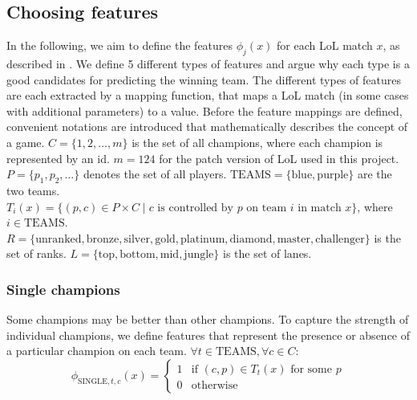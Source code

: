 \subsection{Choosing features}\label{sec:choosingfeatures}
In the following, we aim to define the features $\phi_j(x)$ for each LoL match $x$, as described in .
We define 5 different types of features and argue why each type is a good candidates for predicting the winning team.
The different types of features are each extracted by a mapping function, that maps a LoL match (in some cases with additional parameters) to a value. 
Before the feature mappings are defined, convenient notations are introduced that mathematically describes the concept of a game.
$C = \{1, 2, \dots, m\}$ is the set of all champions, where each champion is represented by an id. $m = 124$ for the patch version of LoL used in this project.
$P = \{p_1, p_2, \dots\}$ denotes the set of all players.
$\text{TEAMS} = \{\text{blue}, \text{purple}\}$ are the two teams.
$T_i(x) = \{ (p, c) \in P \times C \mid c \text{ is controlled by } p \text{ on team } i  \text{ in match } x \}$, where $i \in \text{TEAMS}$.\\
$R = \{\text{unranked},\text{bronze},\text{silver},\text{gold},\text{platinum},\text{diamond},\text{master},\text{challenger}\}$ is the set of ranks.
$L = \{\text{top},\text{bottom},\text{mid},\text{jungle}\}$ is the set of lanes.

\subsubsection{Single champions}
Some champions may be better than other champions. To capture the strength of individual champions, we define features that represent the presence or absence of a particular champion on each team.
$\forall t \in \text{TEAMS}, \forall c \in C:$
\begin{equation}\label{eq:single}  
\phi_{\text{SINGLE}, t, c}(x) = 
\begin{cases} 
  1 & \text{if } (c, p) \in T_t(x) \text{ for some } p \\
  0 & \text{otherwise} 
\end{cases}
\end{equation}


